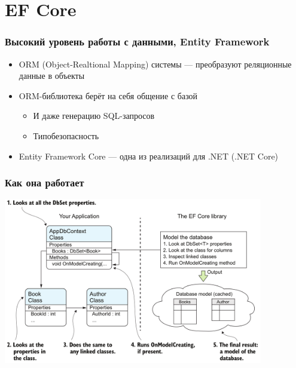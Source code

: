 \documentclass{../../slides-style}
\begin{document}
    \section{EF Core}

    \begin{frame}
        \frametitle{Высокий уровень работы с данными, Entity Framework}
        \begin{itemize}
            \item ORM (Object-Realtional Mapping) системы --- преобразуют реляционные данные в объекты
            \item ORM-библиотека берёт на себя общение с базой
            \begin{itemize}
                \item И даже генерацию SQL-запросов
                \item Типобезопасность
            \end{itemize}
            \item Entity Framework Core --- одна из реализаций для .NET (.NET Core)
        \end{itemize}
    \end{frame}

    \begin{frame}
        \frametitle{Как она работает}
        \begin{center}
            \includegraphics[width=0.85\textwidth]{efCoreDatabaseModeling.png}
        \end{center}
    \end{frame}
\end{document}
